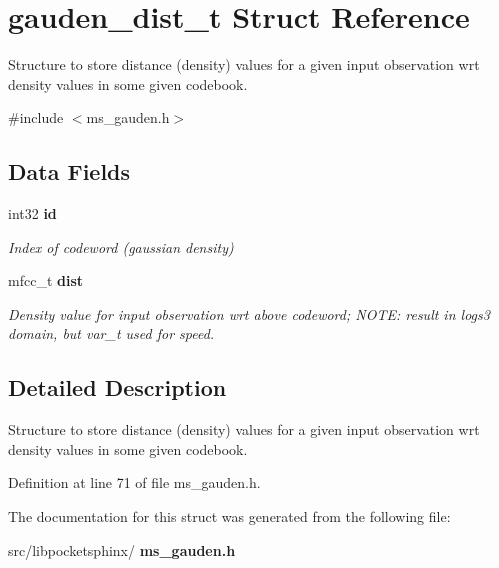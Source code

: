 \section{gauden\+\_\+dist\+\_\+t Struct Reference}
\label{structgauden__dist__t}


Structure to store distance (density) values for a given input observation wrt density values in some given codebook.  




{\ttfamily \#include $<$ms\+\_\+gauden.\+h$>$}

\subsection*{Data Fields}
\begin{DoxyCompactItemize}
\item 
\mbox{\label{structgauden__dist__t_a93e978149bae5b5bf089769458c42ee4}} 
int32 \textbf{ id}
\begin{DoxyCompactList}\small\item\em Index of codeword (gaussian density) \end{DoxyCompactList}\item 
\mbox{\label{structgauden__dist__t_ab08100d4953998dad76bfcf30864c0c5}} 
mfcc\+\_\+t \textbf{ dist}
\begin{DoxyCompactList}\small\item\em Density value for input observation wrt above codeword; N\+O\+TE\+: result in logs3 domain, but var\+\_\+t used for speed. \end{DoxyCompactList}\end{DoxyCompactItemize}


\subsection{Detailed Description}
Structure to store distance (density) values for a given input observation wrt density values in some given codebook. 

Definition at line 71 of file ms\+\_\+gauden.\+h.



The documentation for this struct was generated from the following file\+:\begin{DoxyCompactItemize}
\item 
src/libpocketsphinx/\textbf{ ms\+\_\+gauden.\+h}\end{DoxyCompactItemize}
